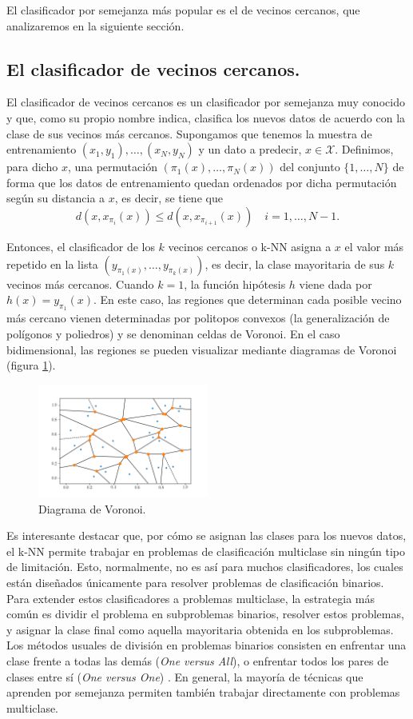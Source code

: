 \documentclass{book}
\begin{document}
El clasificador por semejanza más popular es el de vecinos cercanos, que analizaremos en la siguiente sección.

\subsection{El clasificador de vecinos cercanos.}

El clasificador de vecinos cercanos es un clasificador por semejanza muy conocido y que, como su propio nombre indica, clasifica los nuevos datos de acuerdo con la clase de sus vecinos más cercanos. Supongamos que tenemos la muestra de entrenamiento $(x_1,y_1),\dots,(x_N,y_N)$ y un dato a predecir, $x \in \mathcal{X}$. Definimos, para dicho $x$, una permutación $(\pi_1(x),\dots,\pi_N(x))$ del conjunto $\{1,\dots,N\}$ de forma que los datos de entrenamiento quedan ordenados por dicha permutación según su distancia a $x$, es decir, se tiene que
\[ d(x,x_{\pi_i}(x)) \le d(x,x_{\pi_{i+1}}(x)) \quad i=1,\dots,N-1. \]

Entonces, el clasificador de los $k$ vecinos cercanos o k-NN asigna a $x$ el valor más repetido en la lista $(y_{\pi_1(x)},\dots,y_{\pi_k(x)})$, es decir, la clase mayoritaria de sus $k$ vecinos más cercanos. Cuando $k=1$, la función hipótesis $h$ viene dada por $h(x) = y_{\pi_1}(x)$. En este caso, las regiones que determinan cada posible vecino más cercano vienen determinadas por politopos convexos (la generalización de polígonos y poliedros) y se denominan celdas de Voronoi. En el caso bidimensional, las regiones se pueden visualizar mediante diagramas de Voronoi (figura \ref{fig:voronoi}).

\begin{figure}[h]
	\centering
	\includegraphics[width=0.5\textwidth]{./images/voronoi.png}
	\caption{Diagrama de Voronoi.} \label{fig:voronoi}
\end{figure}

Es interesante destacar que, por cómo se asignan las clases para los nuevos datos, el k-NN permite trabajar en problemas de clasificación multiclase sin ningún tipo de limitación. Esto, normalmente, no es así para muchos clasificadores, los cuales están diseñados únicamente para resolver problemas de clasificación binarios. Para extender estos clasificadores a problemas multiclase, la estrategia más común es dividir el problema en subproblemas binarios, resolver estos problemas, y asignar la clase final como aquella mayoritaria obtenida en los subproblemas. Los métodos usuales de división en problemas binarios consisten en enfrentar una clase frente a todas las demás (\emph{One versus All}), o enfrentar todos los pares de clases entre sí (\emph{One versus One}) \cite{ovoova}. En general, la mayoría de técnicas que aprenden por semejanza permiten también trabajar directamente con problemas multiclase.
\end{document}
